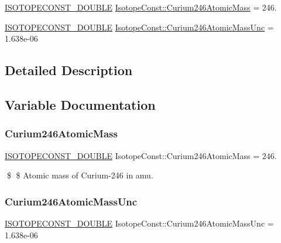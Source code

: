 \begin{DoxyCompactItemize}
\item 
\mbox{\hyperlink{group___isotope_const-_macros_ga8f45a7272ce02c0b4c65c44636ed719a}{I\+S\+O\+T\+O\+P\+E\+C\+O\+N\+S\+T\+\_\+\+D\+O\+U\+B\+LE}} \mbox{\hyperlink{group___isotope_const-_curium-_cm246_gac2e30ce1e933535d3f76a4403f15c75b}{Isotope\+Const\+::\+Curium246\+Atomic\+Mass}} = 246.
\item 
\mbox{\hyperlink{group___isotope_const-_macros_ga8f45a7272ce02c0b4c65c44636ed719a}{I\+S\+O\+T\+O\+P\+E\+C\+O\+N\+S\+T\+\_\+\+D\+O\+U\+B\+LE}} \mbox{\hyperlink{group___isotope_const-_curium-_cm246_ga6fc3d982a37576f81e9e89839ab471a2}{Isotope\+Const\+::\+Curium246\+Atomic\+Mass\+Unc}} = 1.\+638e-\/06
\end{DoxyCompactItemize}


\subsection{Detailed Description}


\subsection{Variable Documentation}
\mbox{\label{group___isotope_const-_curium-_cm246_gac2e30ce1e933535d3f76a4403f15c75b}} 
\subsubsection{\texorpdfstring{Curium246\+Atomic\+Mass}{Curium246AtomicMass}}
{\footnotesize\ttfamily \mbox{\hyperlink{group___isotope_const-_macros_ga8f45a7272ce02c0b4c65c44636ed719a}{I\+S\+O\+T\+O\+P\+E\+C\+O\+N\+S\+T\+\_\+\+D\+O\+U\+B\+LE}} Isotope\+Const\+::\+Curium246\+Atomic\+Mass = 246.}

\$ \$ Atomic mass of Curium-\/246 in amu. \mbox{\label{group___isotope_const-_curium-_cm246_ga6fc3d982a37576f81e9e89839ab471a2}} 
\subsubsection{\texorpdfstring{Curium246\+Atomic\+Mass\+Unc}{Curium246AtomicMassUnc}}
{\footnotesize\ttfamily \mbox{\hyperlink{group___isotope_const-_macros_ga8f45a7272ce02c0b4c65c44636ed719a}{I\+S\+O\+T\+O\+P\+E\+C\+O\+N\+S\+T\+\_\+\+D\+O\+U\+B\+LE}} Isotope\+Const\+::\+Curium246\+Atomic\+Mass\+Unc = 1.\+638e-\/06}

